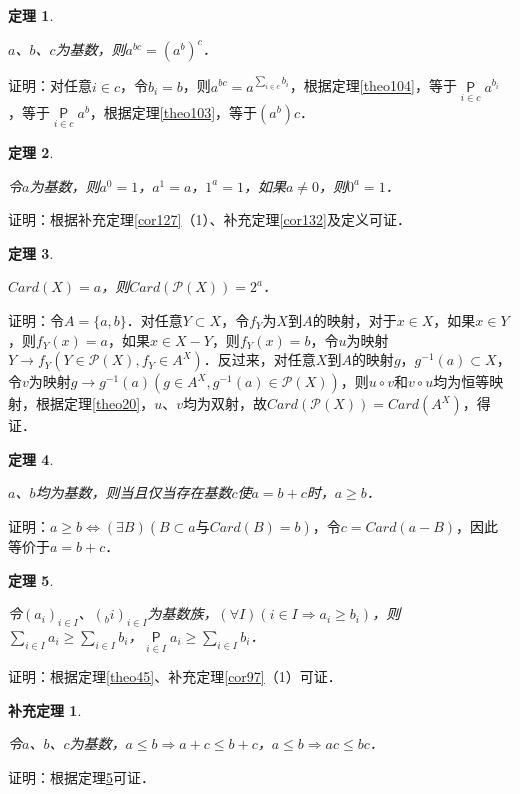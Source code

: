\documentclass[12pt, a4paper, oneside]{book}
\newtheorem{theo}{定理}
\newtheorem{cor}{补充定理}
\begin{document}
			\begin{theo}\label{theo106}
				\hfill\par
				$a$、$b$、$c$为基数，则$a^{bc}=(a^b)^c$．
			\end{theo}
			证明：对任意$i\in c$，令$b_i=b$，则$a^{bc}=a^{\sum\limits_{i\in c} b_i}$，根据定理\ref{theo104}，等于$\mathop{\mathsf{P}}\limits_{i\in c}a^{b_i}$，等于$\mathop{\mathsf{P}}\limits_{i\in c}a^b$，根据定理\ref{theo103}，等于$(a^b)c$．
						
			\begin{theo}\label{theo107}
				\hfill\par
				令$a$为基数，则$a^0=1$，$a^1=a$，$1^a=1$，如果$a\neq 0$，则$0^a=1$．
			\end{theo}
			证明：根据补充定理\ref{cor127}（1）、补充定理\ref{cor132}及定义可证．
			
			\begin{theo}\label{theo108}
				\hfill\par
				$Card(X)=a$，则$Card(\mathcal{P}(X))=2^a$．
			\end{theo}
			证明：令$A=\{a, b\}$．对任意$Y\subset X$，令$f_Y$为$X$到$A$的映射，对于$x\in X$，如果$x\in Y$，则$f_Y(x)=a$，如果$x\in X-Y$，则$f_Y(x)=b$，令$u$为映射$Y\to f_Y(Y\in \mathcal{P}(X), f_Y\in A^X)$．反过来，对任意$X$到$A$的映射$g$，$g^{-1}(a)\subset X$，令$v$为映射$g\to g^{-1}(a)(g\in A^X, g^{-1}(a)\in \mathcal{P}(X))$，则$u\circ v$和$v\circ u$均为恒等映射，根据定理\ref{theo20}，$u$、$v$均为双射，故$Card(\mathcal{P}(X))= Card(A^X)$，得证．
						
			\begin{theo}\label{theo109}
				\hfill\par
				$a$、$b$均为基数，则当且仅当存在基数$c$使$a=b+c$时，$a\geq b$．
			\end{theo}
			证明：$a\geq b\Leftrightarrow (\exists B)(B\subset a\text{与}Card(B)=b)$，令$c=Card(a-B)$，因此等价于$a=b+c$．
						
			\begin{theo}\label{theo110}
				\hfill\par
				令$(a_i)_{i\in I}$、$(_bi)_{i\in I}$为基数族，$(\forall I)(i\in I\Rightarrow a_i\geq b_i)$，则$\sum\limits_{i\in I}a_i\geq \sum\limits_{i\in I}b_i$，$\mathop{\mathsf{P}}\limits_{i\in I}a_i\geq \sum\limits_{i\in I}b_i$．
			\end{theo}
			证明：根据定理\ref{theo45}、补充定理\ref{cor97}（1）可证．
			
			\begin{cor}\label{cor298}
				\hfill\par
				令$a$、$b$、$c$为基数，$a\leq b\Rightarrow a+c\leq b+c$，$a\leq b\Rightarrow ac\leq bc$．
			\end{cor}
			证明：根据定理\ref{theo110}可证．
						
\end{document}
